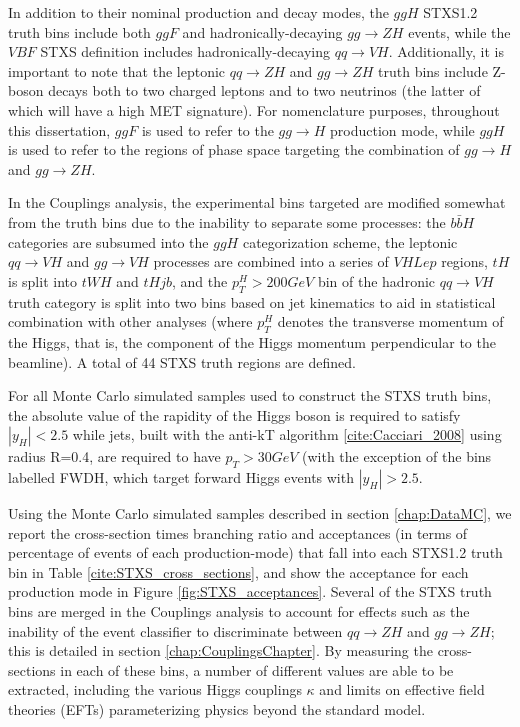 In addition to their nominal production and decay modes, the $ggH$ STXS1.2 truth bins include both $ggF$ and hadronically-decaying $gg \rightarrow ZH$ events, while the $VBF$ STXS definition includes hadronically-decaying $qq \rightarrow VH$. Additionally, it is important to note that the leptonic $qq \rightarrow ZH$ and $gg \rightarrow ZH$ truth bins include Z-boson decays both to two charged leptons and to two neutrinos (the latter of which will have a high MET signature). For nomenclature purposes, throughout this dissertation, $ggF$ is used to refer to the $gg \rightarrow H$ production mode, while $ggH$ is used to refer to the regions of phase space targeting the combination of $gg \rightarrow H$ and $gg \rightarrow ZH$.

In the Couplings analysis, the experimental bins targeted are modified somewhat from the truth bins due to the inability to separate some processes: the $b\bar{b}H$ categories are subsumed into the $ggH$ categorization scheme, the leptonic $qq \rightarrow VH$ and $gg \rightarrow VH$ processes are combined into a series of $VHLep$ regions, $tH$ is split into $tWH$ and $tHjb$, and the $p_{T}^H > 200 GeV$ bin of the hadronic $qq \rightarrow VH$ truth category is split into two bins based on jet kinematics to aid in statistical combination with other analyses (where $p_{T}^{H}$ denotes the transverse momentum of the Higgs, that is, the component of the Higgs momentum perpendicular to the beamline). A total of 44 STXS truth regions are defined.

For all Monte Carlo simulated samples used to construct the STXS truth bins, the absolute value of the rapidity of the Higgs boson is required to satisfy $|y_{H}| < 2.5$ while jets, built with the anti-kT algorithm \ref{cite:Cacciari_2008} using radius R=0.4, are required to have $p_{T} > 30 GeV$ (with the exception of the bins labelled FWDH, which target forward Higgs events with $|y_{H}| > 2.5$.

Using the Monte Carlo simulated samples described in section \ref{chap:DataMC}, we report the cross-section times branching ratio and acceptances (in terms of percentage of events of each production-mode) that fall into each STXS1.2 truth bin in Table \ref{cite:STXS_cross_sections}, and show the acceptance for each production mode in Figure \ref{fig:STXS_acceptances}. Several of the STXS truth bins are merged in the Couplings analysis to account for effects such as the inability of the event classifier to discriminate between $qq \rightarrow ZH$ and $gg \rightarrow ZH$; this is detailed in section \ref{chap:CouplingsChapter}. By measuring the cross-sections in each of these bins, a number of different values are able to be extracted, including the various Higgs couplings $\kappa$ and limits on effective field theories (EFTs) parameterizing physics beyond the standard model.

